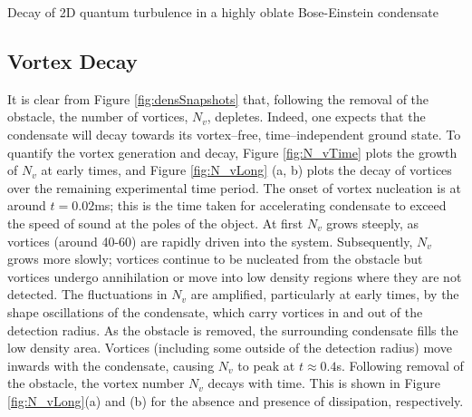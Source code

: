 \begin{chapter}{\label{cha:shin}Decay of 2D quantum turbulence in a highly oblate Bose-Einstein condensate}
\subsection{Vortex Decay}
It is clear from Figure \ref{fig:densSnapshots} that, following the removal 
of the obstacle, the number of vortices, $N_v$, depletes.   
Indeed, one expects that the condensate will decay towards its 
vortex--free, time--independent ground state.  To quantify the vortex generation and
decay, Figure \ref{fig:N_vTime} plots the growth of $N_v$ at early times, 
and Figure \ref{fig:N_vLong} (a, b) plots the decay of vortices over the remaining experimental time period. 
The onset of vortex nucleation is at around $t=0.02$ms; 
this is the time taken for accelerating condensate to exceed the speed of 
sound at the poles of the object.
At first $N_v$ grows steeply, as vortices (around 40-60) are rapidly driven into the system. Subsequently, $N_v$ grows more slowly; vortices continue to be nucleated from the obstacle but vortices undergo annihilation or move into low density regions where they are not detected.  The fluctuations in $N_v$ are amplified, particularly at early times, by the shape oscillations of the condensate, which carry vortices in and out of the detection radius. As the obstacle is removed, the surrounding condensate fills the low density area. Vortices (including some outside of the detection radius) move inwards with the condensate, causing $N_v$ to peak at $t\approx 0.4$s. Following removal of the obstacle, the vortex number $N_v$ decays with time.  This is shown in Figure \ref{fig:N_vLong}(a) and (b) for the absence and presence of dissipation, respectively.


\end{chapter}
